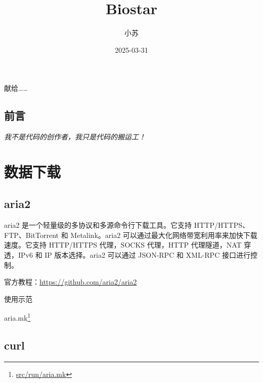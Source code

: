 \documentclass[]{ctexbook}
\title{Biostar}
\author{小苏}
\date{2025-03-31}
\newenvironment{Shaded}{\begin{snugshade}}{\end{snugshade}}
\newcommand{\AttributeTok}[1]{\textcolor[rgb]{0.13,0.29,0.53}{#1}}
\newcommand{\FunctionTok}[1]{\textcolor[rgb]{0.13,0.29,0.53}{\textbf{#1}}}
\newcommand{\NormalTok}[1]{#1}
\newcommand{\OperatorTok}[1]{\textcolor[rgb]{0.81,0.36,0.00}{\textbf{#1}}}
\newcommand{\VariableTok}[1]{\textcolor[rgb]{0.00,0.00,0.00}{#1}}
\renewcommand{\href}[2]{#2\footnote{\url{#1}}}
\begin{document}
\maketitle

\thispagestyle{empty}

\begin{center}
献给……
\end{center}

\setlength{\abovedisplayskip}{-5pt}
\setlength{\abovedisplayshortskip}{-5pt}

{
\setcounter{tocdepth}{1}
\tableofcontents
}
\listoftables
\listoffigures
\chapter*{前言}\label{ux524dux8a00}


\emph{我不是代码的创作者，我只是代码的搬运工！}

\part{数据下载}\label{part-ux6570ux636eux4e0bux8f7d}

\chapter{aria2}\label{aria2}

aria2 是一个轻量级的多协议和多源命令行下载工具。它支持 HTTP/HTTPS、FTP、BitTorrent 和 Metalink。aria2 可以通过最大化网络带宽利用率来加快下载速度。它支持 HTTP/HTTPS 代理，SOCKS 代理，HTTP 代理隧道，NAT 穿透，IPv6 和 IP 版本选择。aria2 可以通过 JSON-RPC 和 XML-RPC 接口进行控制。

官方教程：\url{https://github.com/aria2/aria2}

使用示范

\begin{Shaded}
\end{Shaded}

\href{src/run/aria.mk}{aria.mk}

\chapter{curl}\label{curl}
\end{document}
